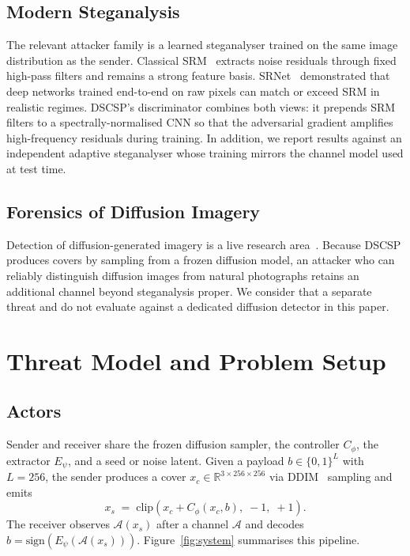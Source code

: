 \documentclass[journal]{IEEEtran}
\begin{document}
\subsection{Modern Steganalysis}
The relevant attacker family is a learned steganalyser trained on the
same image distribution as the sender. Classical
SRM~\cite{fridrich2012rich} extracts noise residuals through fixed
high-pass filters and remains a strong feature basis.
SRNet~\cite{boroumand2019deep} demonstrated that deep networks
trained end-to-end on raw pixels can match or exceed SRM in realistic
regimes. DSCSP's discriminator combines both views: it prepends SRM
filters to a spectrally-normalised CNN so that the adversarial
gradient amplifies high-frequency residuals during training. In
addition, we report results against an independent adaptive
steganalyser whose training mirrors the channel model used at test
time.

\subsection{Forensics of Diffusion Imagery}
Detection of diffusion-generated imagery is a live research
area~\cite{corvi2023detection}. Because DSCSP produces covers by
sampling from a frozen diffusion model, an attacker who can reliably
distinguish diffusion images from natural photographs retains an
additional channel beyond steganalysis proper. We consider that a
separate threat and do not evaluate against a dedicated diffusion
detector in this paper.

\section{Threat Model and Problem Setup}
\label{sec:setup}

\subsection{Actors}
Sender and receiver share the frozen diffusion sampler, the
controller $C_\phi$, the extractor $E_\psi$, and a seed or noise
latent. Given a payload $b\in\{0,1\}^{L}$ with $L=256$, the sender
produces a cover $x_c\in\mathbb{R}^{3\times 256\times 256}$ via
DDIM~\cite{song2020denoising} sampling and emits
\begin{equation}
x_s \;=\; \mathrm{clip}\!\left(x_c + C_\phi(x_c, b),\; -1,\; +1\right).
\label{eq:embed}
\end{equation}
The receiver observes $\mathcal{A}(x_s)$ after a channel
$\mathcal{A}$ and decodes $\hat{b}=\mathrm{sign}(E_\psi(\mathcal{A}(x_s)))$.
Figure~\ref{fig:system} summarises this pipeline.
\end{document}
